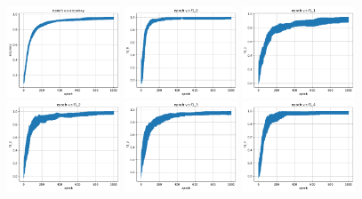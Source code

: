 \begin{figure}
    \centering
    \includegraphics[width=0.30\textwidth]{figures/mnist_nn_accuracy.pdf}
    \includegraphics[width=0.30\textwidth]{figures/mnist_nn_f1_0.pdf}
    \includegraphics[width=0.30\textwidth]{figures/mnist_nn_f1_1.pdf}
    \includegraphics[width=0.30\textwidth]{figures/mnist_nn_f1_2.pdf}
    \includegraphics[width=0.30\textwidth]{figures/mnist_nn_f1_3.pdf}
    \includegraphics[width=0.30\textwidth]{figures/mnist_nn_f1_4.pdf}

\end{figure}
